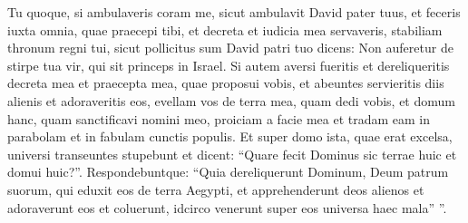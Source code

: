 \begin{biblechapter}
\begin{biblechapter}
\begin{biblechapter}
\begin{biblechapter}
\begin{biblechapter}
\begin{biblechapter}
\begin{biblechapter}
 \verse Tu quoque, si ambulaveris coram me, sicut ambulavit David pater tuus, et feceris iuxta omnia, quae praecepi tibi, et decreta et iudicia mea servaveris, 
\verse stabiliam thronum regni tui, sicut pollicitus sum David patri tuo dicens: Non auferetur de stirpe tua vir, qui sit princeps in Israel. 
\verse Si autem aversi fueritis et dereliqueritis decreta mea et praecepta mea, quae proposui vobis, et abeuntes servieritis diis alienis et adoraveritis eos, 
\verse evellam vos de terra mea, quam dedi vobis, et domum hanc, quam sanctificavi nomini meo, proiciam a facie mea et tradam eam in parabolam et in fabulam cunctis populis. 
 \verse Et super domo ista, quae erat excelsa, universi transeuntes stupebunt et dicent: “Quare fecit Dominus sic terrae huic et domui huic?”. 
\verse Respondebuntque: “Quia dereliquerunt Dominum, Deum patrum suorum, qui eduxit eos de terra Aegypti, et apprehenderunt deos alienos et adoraverunt eos et coluerunt, idcirco venerunt super eos universa haec mala” ”.
 

\end{biblechapter}
\end{biblechapter}
\end{biblechapter}
\end{biblechapter}
\end{biblechapter}
\end{biblechapter}
\end{biblechapter}
